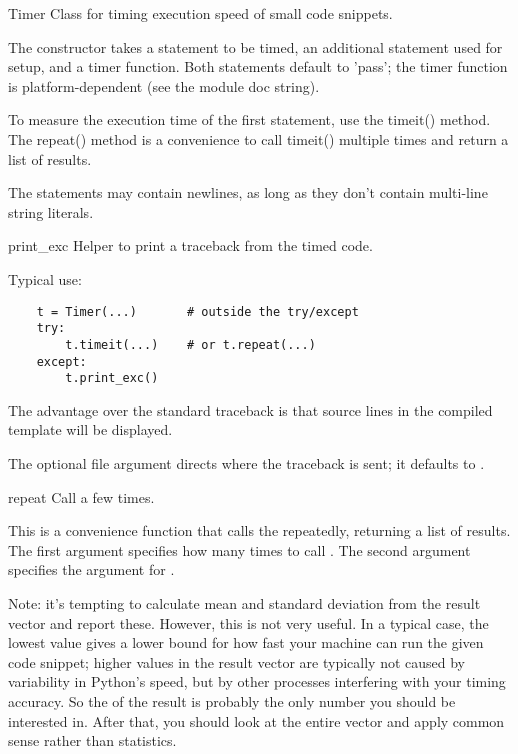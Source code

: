 \begin{classdesc}{Timer}{}
Class for timing execution speed of small code snippets.

The constructor takes a statement to be timed, an additional statement used
for setup, and a timer function.  Both statements default to 'pass'; the
timer function is platform-dependent (see the module doc string).

To measure the execution time of the first statement, use the timeit()
method.  The repeat() method is a convenience to call timeit() multiple
times and return a list of results.

The statements may contain newlines, as long as they don't contain
multi-line string literals.

\begin{methoddesc}{print_exc}{}
Helper to print a traceback from the timed code.

Typical use:

\begin{verbatim}
    t = Timer(...)       # outside the try/except
    try:
        t.timeit(...)    # or t.repeat(...)
    except:
        t.print_exc()
\end{verbatim}

The advantage over the standard traceback is that source lines in the
compiled template will be displayed.

The optional file argument directs where the traceback is sent; it defaults
to .
\end{methoddesc}

\begin{methoddesc}{repeat}{}
Call  a few times.

This is a convenience function that calls the  repeatedly,
returning a list of results.  The first argument specifies how many times to
call .  The second argument specifies the 
argument for .

Note: it's tempting to calculate mean and standard deviation from the result
vector and report these.  However, this is not very useful.  In a typical
case, the lowest value gives a lower bound for how fast your machine can run
the given code snippet; higher values in the result vector are typically not
caused by variability in Python's speed, but by other processes interfering
with your timing accuracy.  So the  of the result is
probably the only number you should be interested in.  After that, you
should look at the entire vector and apply common sense rather than
statistics.
\end{methoddesc}


\end{classdesc}
